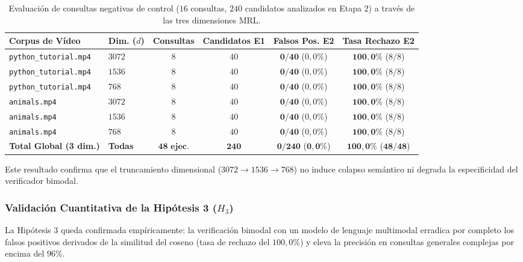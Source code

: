 \begin{table}[htbp]
\centering
\small
\setlength{\tabcolsep}{4.0pt}
\caption{Evaluación de consultas negativas de control ($16$ consultas, $240$ candidatos analizados en Etapa 2) a través de las tres dimensiones MRL.}
\label{tab:ablacion_mrl_negativas}
\begin{tabular}{llcccc}
\toprule
\textbf{Corpus de Vídeo} & \textbf{Dim. ($d$)} & \textbf{Consultas} & \textbf{Candidatos E1} & \textbf{Falsos Pos. E2} & \textbf{Tasa Rechazo E2} \\
\midrule
\texttt{python\_tutorial.mp4} & $3072$ & $8$ & $40$ & $\mathbf{0/40}$ ($0,0\%$) & $\mathbf{100,0\%}$ ($8/8$) \\
\texttt{python\_tutorial.mp4} & $1536$ & $8$ & $40$ & $\mathbf{0/40}$ ($0,0\%$) & $\mathbf{100,0\%}$ ($8/8$) \\
\texttt{python\_tutorial.mp4} & $768$  & $8$ & $40$ & $\mathbf{0/40}$ ($0,0\%$) & $\mathbf{100,0\%}$ ($8/8$) \\
\midrule
\texttt{animals.mp4}          & $3072$ & $8$ & $40$ & $\mathbf{0/40}$ ($0,0\%$) & $\mathbf{100,0\%}$ ($8/8$) \\
\texttt{animals.mp4}          & $1536$ & $8$ & $40$ & $\mathbf{0/40}$ ($0,0\%$) & $\mathbf{100,0\%}$ ($8/8$) \\
\texttt{animals.mp4}          & $768$  & $8$ & $40$ & $\mathbf{0/40}$ ($0,0\%$) & $\mathbf{100,0\%}$ ($8/8$) \\
\midrule
\textbf{Total Global (3 dim.)} & \textbf{Todas} & $\mathbf{48\text{ ejec.}}$ & $\mathbf{240}$ & $\mathbf{0/240}$ ($\mathbf{0,0\%}$) & $\mathbf{100,0\%}$ ($\mathbf{48/48}$) \\
\bottomrule
\end{tabular}
\end{table}

Este resultado confirma que el truncamiento dimensional ($3072 \to 1536 \to 768$) no induce colapso semántico ni degrada la especificidad del verificador bimodal.

\subsubsection{Validación Cuantitativa de la Hipótesis 3 ($H_3$)}
La Hipótesis 3 queda confirmada empíricamente: la verificación bimodal con un modelo de lenguaje multimodal erradica por completo los falsos positivos derivados de la similitud del coseno (tasa de rechazo del $100,0\%$) y eleva la precisión en consultas generales complejas por encima del $96\%$.
